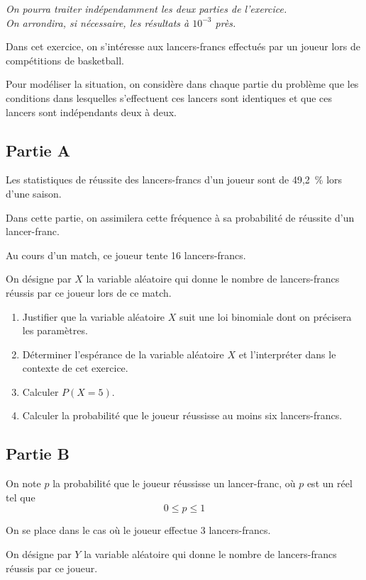 \emph{On pourra traiter indépendamment les deux parties de l'exercice. \\
On arrondira, si nécessaire, les résultats à $10^{-3}$ près.}

\medskip
Dans cet exercice, on s'intéresse aux lancers-francs effectués par un joueur lors de compétitions de basketball.

Pour modéliser la situation, on considère dans chaque partie du problème que les conditions dans lesquelles s'effectuent ces lancers sont identiques et que ces lancers sont indépendants deux à deux.

\subsection*{Partie  A}
	Les statistiques de réussite des lancers-francs d'un joueur sont de 49,2~\% lors d'une saison.

	Dans cette partie, on assimilera cette fréquence à sa probabilité de réussite d'un lancer-franc.

	Au cours d'un match, ce joueur tente 16 lancers-francs.

	On désigne par $X$ la variable aléatoire qui donne le nombre de lancers-francs réussis par ce joueur lors de ce match.

	\begin{enumerate}
		\item Justifier que la variable aléatoire $X$ suit une loi binomiale dont on précisera les paramètres.

		\item Déterminer l'espérance de la variable aléatoire $X$ et l'interpréter dans le contexte de cet exercice.

		\item Calculer $P(X=5)$.

		\item Calculer la probabilité que le joueur réussisse au moins six lancers-francs.
	\end{enumerate}

\subsection*{Partie  B}
	On note $p$ la probabilité que le joueur réussisse un lancer-franc, où $p$ est un réel tel que
	\[0 \leqslant  p \leqslant  1\]

	On se place dans le cas où le joueur effectue 3 lancers-francs.

	On désigne par $Y$ la variable aléatoire qui donne le nombre de lancers-francs réussis par ce joueur.

